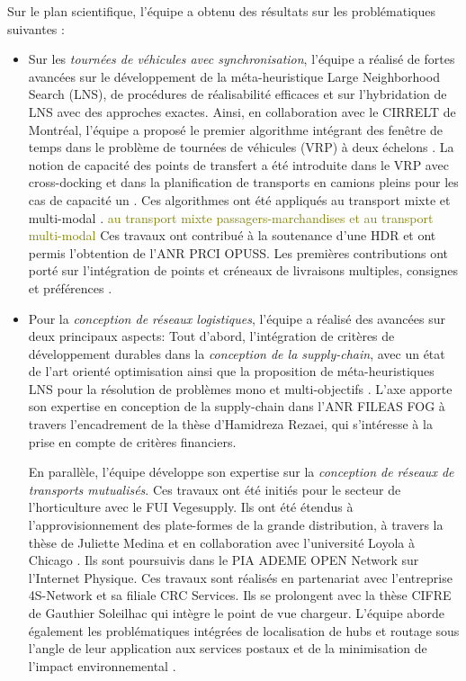 Sur le plan scientifique, l'équipe a obtenu des résultats sur les problématiques suivantes : 
\begin{itemize}
	\item Sur les \textit{tournées de véhicules avec synchronisation}, l'équipe a réalisé de fortes avancées sur le développement de la méta-heuristique Large Neighborhood Search (LNS), de procédures de réalisabilité efficaces et sur l'hybridation de LNS avec des approches exactes. Ainsi, en collaboration avec le CIRRELT de Montréal, l'équipe a proposé le premier algorithme intégrant des fenêtre de temps dans le problème de tournées de véhicules (VRP) à deux échelons \cite{grangier2015}. La notion de capacité des points de transfert a été introduite dans le VRP avec cross-docking \cite{grangier:hal-01499170,grangier:hal-02277261} et dans la planification de transports en camions pleins pour les cas de capacité un \cite{grimault:hal-01543503,grimault:tel-01343199}. Ces algorithmes ont été appliqués au transport mixte et multi-modal \cite{masson:hal-01068305}. \textcolor{olive}{au transport mixte passagers-marchandises et au transport multi-modal}
	Ces travaux ont contribué à la soutenance d'une HDR \cite{lehuede:tel-01441778} et ont permis l'obtention de l'ANR PRCI OPUSS. Les premières contributions ont porté sur l'intégration de points et créneaux de livraisons multiples, consignes et préférences  \cite{dumez:hal-02452252}.
	\item Pour la \textit{conception de réseaux logistiques}, l'équipe a réalisé des avancées sur deux principaux aspects: Tout d'abord, l'intégration de critères de développement durables dans la \textit{conception de la supply-chain}, avec un état de l'art orienté optimisation \cite{eskandarpour:hal-01154605} ainsi que la proposition de méta-heuristiques LNS pour la résolution de problèmes mono et multi-objectifs \cite{eskandarpour:hal-01433630, eskandarpour:hal-02407741}.
	L'axe apporte son expertise en conception de la supply-chain dans l'ANR FILEAS FOG à travers l'encadrement de la thèse d'Hamidreza Rezaei, qui s'intéresse à la prise en compte de critères financiers.

    En parallèle, l'équipe développe son expertise sur la \textit{conception de réseaux de transports mutualisés}. Ces travaux ont été initiés pour le secteur de l'horticulture \cite{tang:hal-01591618} avec le FUI Vegesupply. Ils ont été étendus à l'approvisionnement des plate-formes de la grande distribution, à travers la thèse de Juliette Medina \cite{medina:tel-01460708} et en collaboration avec l'université Loyola à Chicago \cite{medina:hal-01689718}. Ils sont poursuivis dans le PIA ADEME OPEN Network sur l'Internet Physique. Ces travaux sont réalisés en partenariat avec l'entreprise 4S-Network et sa filiale CRC Services. Ils se prolongent avec la thèse CIFRE de Gauthier Soleilhac qui intègre le point de vue chargeur. 
    L'équipe aborde également les problématiques intégrées de localisation de hubs et routage sous l'angle de leur application aux services postaux \cite{bostel:hal-01320357,yang:hal-02524875} et de la minimisation de l'impact environnemental \cite{yang:these}.
    

\end{itemize}
